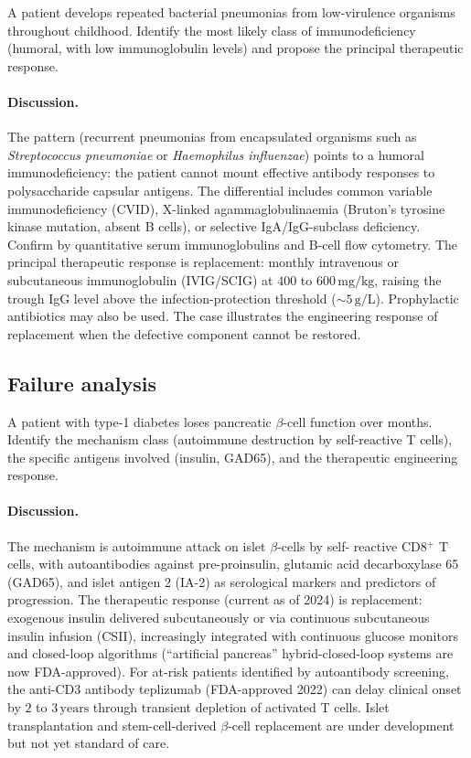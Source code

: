 \begin{exercise}
A patient develops repeated bacterial pneumonias from low-virulence
organisms throughout childhood. Identify the most likely class of
immunodeficiency (humoral, with low immunoglobulin levels) and propose
the principal therapeutic response.
\end{exercise}

\paragraph{Discussion.}
The pattern (recurrent pneumonias from encapsulated organisms such
as \emph{Streptococcus pneumoniae} or \emph{Haemophilus influenzae})
points to a humoral immunodeficiency: the patient cannot mount
effective antibody responses to polysaccharide capsular antigens.
The differential includes common variable immunodeficiency (CVID),
X-linked agammaglobulinaemia (Bruton's tyrosine kinase mutation,
absent B cells), or selective IgA/IgG-subclass deficiency. Confirm
by quantitative serum immunoglobulins and B-cell flow cytometry.
The principal therapeutic response is replacement: monthly intravenous
or subcutaneous immunoglobulin (IVIG/SCIG) at $400$ to
$600\,\text{mg/kg}$, raising the trough IgG level above the
infection-protection threshold ($\sim 5\,\text{g/L}$). Prophylactic
antibiotics may also be used. The case illustrates the engineering
response of replacement when the defective component cannot be
restored.

\subsection*{Failure analysis}

\begin{exercise}
A patient with type-1 diabetes loses pancreatic $\beta$-cell function
over months. Identify the mechanism class (autoimmune destruction by
self-reactive T cells), the specific antigens involved (insulin, GAD65),
and the therapeutic engineering response.
\end{exercise}

\paragraph{Discussion.}
The mechanism is autoimmune attack on islet $\beta$-cells by self-
reactive CD8$^+$ T cells, with autoantibodies against pre-proinsulin,
glutamic acid decarboxylase 65 (GAD65), and islet antigen 2 (IA-2)
as serological markers and predictors of progression. The therapeutic
response (current as of 2024) is replacement: exogenous insulin
delivered subcutaneously or via continuous subcutaneous insulin
infusion (CSII), increasingly integrated with continuous glucose
monitors and closed-loop algorithms (``artificial pancreas''
hybrid-closed-loop systems are now FDA-approved). For at-risk
patients identified by autoantibody screening, the anti-CD3 antibody
teplizumab (FDA-approved 2022) can delay clinical onset by $2$ to
$3\,\text{years}$ through transient depletion of activated T cells.
Islet transplantation and stem-cell-derived $\beta$-cell replacement
are under development but not yet standard of care.

